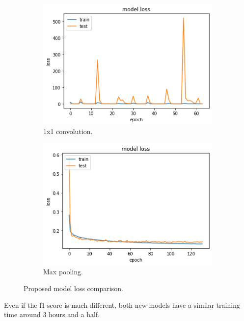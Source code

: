 \documentclass{article}
\begin{document}
\begin{figure}[H]
	\centering
	\begin{subfigure}{.5\textwidth}
		\centering
		\includegraphics[width=.9\linewidth]{./images/poly/new model_loss.png}
		\caption{1x1 convolution.}
	\end{subfigure}%
	\begin{subfigure}{.5\textwidth}
		\centering
		\includegraphics[width=.9\linewidth]{./images/poly/new model_loss_new.png}
		\caption{Max pooling.}
	\end{subfigure}
	\caption{Proposed model loss comparison.}
	\label{fig:poly_new_loss}
\end{figure}

Even if the f1-score is much different, both new models have a similar training time around 3 hours and a half.
\end{document}
